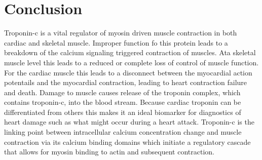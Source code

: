 \documentclass[12pt]{article}
\begin{document}


\section{Conclusion}
Troponin-c is a vital regulator of myosin driven muscle contraction in both cardiac and skeletal muscle. Improper function fo this protein leads to a breakdown of the calcium signaling triggered contraction of muscles. Ata skeletal muscle level this leads to a reduced or complete loss of control of muscle function. For the cardiac muscle this leads to a disconnect between the myocardial action potentails and the myocardial contraction, leading to heart contraction failure and death. Damage to muscle causes release of the troponin complex, which contains troponin-c, into the blood stream. Because cardiac troponin can be differentiated from others this makes it an ideal biomarker for diagnostics of heart damage such as what might occur during a heart attack. Troponin-c is the linking point between intracellular calcium concentration change and muscle contraction via its calcium binding domains which initiate a regulatory cascade that allows for myosin binding to actin and subsequent contraction.

%
%
\end{document}
